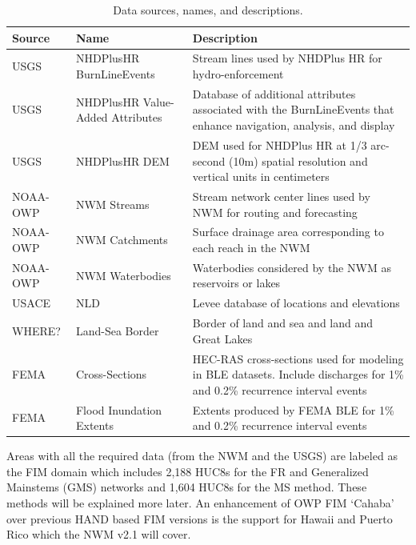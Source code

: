 \begin{table}
\caption{Data sources, names, and descriptions.}
\label{tab:data}
\centering
\begin{tabular}{|p{2cm}|p{4cm}|p{8cm}|}
\hline
Source & Name & Description \\
\hline
USGS & NHDPlusHR BurnLineEvents & Stream lines used by NHDPlus HR for hydro-enforcement \\
\hline
USGS & NHDPlusHR Value-Added Attributes & Database of additional attributes associated with the BurnLineEvents that enhance navigation, analysis, and display \\
\hline
USGS & NHDPlusHR DEM & DEM used for NHDPlus HR at 1/3 arc-second (10m) spatial resolution and vertical units in centimeters \\
\hline
NOAA-OWP & NWM Streams & Stream network center lines used by NWM for routing and forecasting \\
\hline
NOAA-OWP & NWM Catchments & Surface drainage area corresponding to each reach in the NWM \\
\hline
NOAA-OWP & NWM Waterbodies & Waterbodies considered by the NWM as reservoirs or lakes \\
\hline
USACE & NLD & Levee database of locations and elevations  \\
\hline
WHERE? & Land-Sea Border & Border of land and sea and land and Great Lakes \\
\hline
FEMA & Cross-Sections & HEC-RAS cross-sections used for modeling in BLE datasets. Include discharges for 1\% and 0.2\% recurrence interval events \\
\hline
FEMA & Flood Inundation Extents & Extents produced by FEMA BLE for 1\% and 0.2\% recurrence interval events \\
\hline
\end{tabular}
\end{table}
%
Areas with all the required data (from the NWM and the USGS) are labeled as the FIM domain which includes 2,188 HUC8s for the FR and Generalized Mainstems (GMS) networks and 1,604 HUC8s for the MS method. 
These methods will be explained more later.
An enhancement of OWP FIM `Cahaba' over previous HAND based FIM versions is the support for Hawaii and Puerto Rico which the NWM v2.1 will cover.
%
